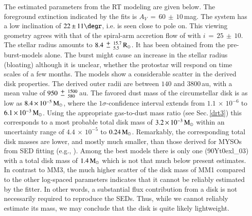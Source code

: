 The estimated parameters from the RT modeling are given below.
The foreground extinction indicated by the fits is $A_V\,{=}\,60\,{\pm}\, 10$\,mag. The system has a low inclination of $22\,{\pm}\,11\degr$, i.e. is seen close to pole on. This viewing geometry agrees with that of the spiral-arm accretion flow of \citet{2020NatAs.tmp..144C} with $i\,{=}\,25\,{\pm}\,10$\degr{}.
The stellar radius amounts to $8.4\,{\mypm}\,_{5.5}^{15.7}{\, \rm R}_\odot$. It has been obtained from the pre-burst-models alone. The burst might cause an increase in the stellar radius (bloating) although it is unclear, whether the protostar will respond on time scales of a few months.
The models show a considerable scatter in the derived disk properties. The derived outer radii are between $140$ and 3800\,au, with a mean value of $950\,{\mypm}\,_{580}^{1500}$\,au. 
The favored dust mass of the circumstellar disk is as low as $8.4\,{\times}\, 10^{-5}\,{\rm M}_\odot$, where the $1\sigma$-confidence interval extends from $1.1\,{\times}\, 10^{-6}$ to $6.1\,{\times}\, 10^{-3}\,{\rm M}_\odot$. 
Using the appropriate gas-to-dust mass ratio (see Sec.\,\ref{drt3}) this corresponds to a most probable total disk mass of 
$3.2\,{\times}\, 10^{-3}\,{\rm M}_\odot$ within an uncertainty range of $4.4\,{\times}\, 10^{-5}$ to $0.24\,{\rm M}_\odot$.
Remarkably, the corresponding total disk masses are lower, and mostly much smaller, than those derived for MYSOs from SED fitting (e.g., \citealp{2010Natur.466..339K, 2015ApJ...813L..19J}).  
Among the best models there is only one (90Yt0exl\_03) with a total disk mass of $1.4\,{\rm M}_\odot$ which is not that much below present estimates. In contrast to MM3, the much higher scatter of the disk mass of MM1 compared to the other log-spaced parameters indicates that it cannot be reliably estimated by the fitter. In other words, a substantial flux contribution from a disk is not necessarily required to reproduce the SEDs. Thus, while we cannot reliably estimate its mass, we may conclude that the disk is quite likely lightweight.

